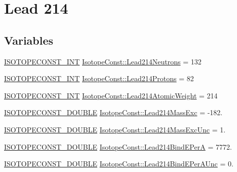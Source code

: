 \hypertarget{group___isotope_const-_lead-_pb214}{}\section{Lead 214}
\label{group___isotope_const-_lead-_pb214}
\subsection*{Variables}
\begin{DoxyCompactItemize}
\item 
\mbox{\hyperlink{group___isotope_const-_macros_ga5f18360b3e99483a35c32d789e62621c}{I\+S\+O\+T\+O\+P\+E\+C\+O\+N\+S\+T\+\_\+\+I\+NT}} \mbox{\hyperlink{group___isotope_const-_lead-_pb214_gaf936a121f9df15243577a284d18eb330}{Isotope\+Const\+::\+Lead214\+Neutrons}} = 132
\item 
\mbox{\hyperlink{group___isotope_const-_macros_ga5f18360b3e99483a35c32d789e62621c}{I\+S\+O\+T\+O\+P\+E\+C\+O\+N\+S\+T\+\_\+\+I\+NT}} \mbox{\hyperlink{group___isotope_const-_lead-_pb214_gab334c69c02bcd336c63fddbfc017d339}{Isotope\+Const\+::\+Lead214\+Protons}} = 82
\item 
\mbox{\hyperlink{group___isotope_const-_macros_ga5f18360b3e99483a35c32d789e62621c}{I\+S\+O\+T\+O\+P\+E\+C\+O\+N\+S\+T\+\_\+\+I\+NT}} \mbox{\hyperlink{group___isotope_const-_lead-_pb214_gaa92d22afb25883c63dd4997ed84e3db8}{Isotope\+Const\+::\+Lead214\+Atomic\+Weight}} = 214
\item 
\mbox{\hyperlink{group___isotope_const-_macros_ga8f45a7272ce02c0b4c65c44636ed719a}{I\+S\+O\+T\+O\+P\+E\+C\+O\+N\+S\+T\+\_\+\+D\+O\+U\+B\+LE}} \mbox{\hyperlink{group___isotope_const-_lead-_pb214_gacaab191e9175f417c224dd399c0870a9}{Isotope\+Const\+::\+Lead214\+Mass\+Exc}} = -\/182.
\item 
\mbox{\hyperlink{group___isotope_const-_macros_ga8f45a7272ce02c0b4c65c44636ed719a}{I\+S\+O\+T\+O\+P\+E\+C\+O\+N\+S\+T\+\_\+\+D\+O\+U\+B\+LE}} \mbox{\hyperlink{group___isotope_const-_lead-_pb214_ga58c1613d8fe581007a71bc514452cdd0}{Isotope\+Const\+::\+Lead214\+Mass\+Exc\+Unc}} = 1.
\item 
\mbox{\hyperlink{group___isotope_const-_macros_ga8f45a7272ce02c0b4c65c44636ed719a}{I\+S\+O\+T\+O\+P\+E\+C\+O\+N\+S\+T\+\_\+\+D\+O\+U\+B\+LE}} \mbox{\hyperlink{group___isotope_const-_lead-_pb214_gab64988a14c4aa481ad56743ce93c5953}{Isotope\+Const\+::\+Lead214\+Bind\+E\+PerA}} = 7772.
\item 
\mbox{\hyperlink{group___isotope_const-_macros_ga8f45a7272ce02c0b4c65c44636ed719a}{I\+S\+O\+T\+O\+P\+E\+C\+O\+N\+S\+T\+\_\+\+D\+O\+U\+B\+LE}} \mbox{\hyperlink{group___isotope_const-_lead-_pb214_gae1fd445801c433b3ab7d345d670e74e2}{Isotope\+Const\+::\+Lead214\+Bind\+E\+Per\+A\+Unc}} = 0.

\end{DoxyCompactItemize}
